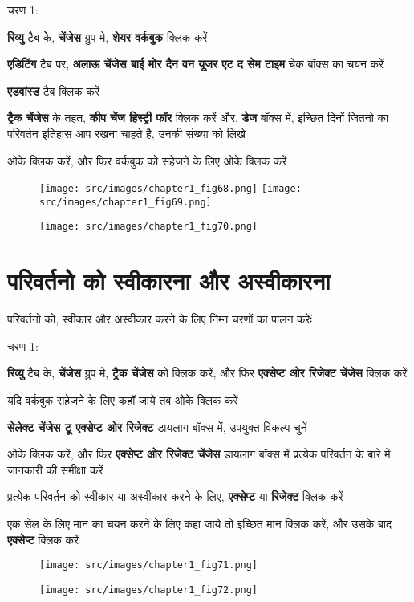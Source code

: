 \begin{descriptionSimple}{चरण 1:}
\item[चरण 1] \textbf{रिव्यु} टैब केे, \textbf{चेंजेस} ग्रुप मे, \textbf{शेयर वर्कबुक} क्लिक करें
\item[चरण 2] \textbf{एडिटिंग} टैब पर, \textbf{अलाऊ चेंजेस बाई मोर दैन वन यूजर एट द सेम टाइम} चेक बॉक्स का चयन करें
\item[चरण 3] \textbf{एडवांस्ड} टैब क्लिक करें
\item[चरण 4] \textbf{ट्रैक चेंजेस} के तहत, \textbf{कीप चेंज हिस्ट्री फॉर} क्लिक करें और, \textbf{डेज} बॉक्स में, इच्छित दिनों जितनो का परिवर्तन इतिहास आप रखना चाहते है, उनकी संख्या को लिखे
\item[चरण 5] ओके क्लिक करें, और फिर वर्कबुक को सहेजने के लिए ओके क्लिक करें
\end{descriptionSimple}
\begin{figure}[H]
\centering
\texttt{[image: src/images/chapter1\_fig68.png]}\qquad
\texttt{[image: src/images/chapter1\_fig69.png]}
\end{figure}
\begin{figure}[H]
\centering
\texttt{[image: src/images/chapter1\_fig70.png]}
\end{figure}				
					
\section{परिवर्तनो को स्वीकारना और अस्वीकारना}\label{id-1.42}

परिवर्तनो को, स्वीकार और अस्वीकार करने के लिए निम्न चरणों का पालन करेःं

\begin{descriptionSimple}{चरण 1:}
\item[चरण 1] \textbf{रिव्यु} टैब के, \textbf{चेंजेस} ग्रुप मे, \textbf{ट्रैक चेंजेस} को क्लिक करें, और फिर \textbf{एक्सेप्ट ओर रिजेक्ट चेंजेस} क्लिक करें
\item[चरण 2] यदि वर्कबुक सहेजने के लिए कहॉ जाये तब ओके क्लिक करें
\item[चरण 3] \textbf{सेलेक्ट चेंजेस टू एक्सेप्ट ओर रिजेक्ट} डायलाग बॉक्स में, उपयुक्त विकल्प चुनें
\item[चरण 4] ओके क्लिक करें, और फिर \textbf{एक्सेप्ट ओर रिजेक्ट चेंजेस} डायलाग बॉक्स में प्रत्येक परिवर्तन के बारे में जानकारी की समीक्षा करें
\item[चरण 5] प्रत्येक परिवर्तन को स्वीकार या अस्वीकार करने के लिए, \textbf{एक्सेप्ट} या \textbf{रिजेक्ट} क्लिक करें
\item[चरण 6] एक सेल के लिए मान का चयन करने के लिए कहा जाये तो इच्छित मान क्लिक करें, और उसके बाद \textbf{एक्सेप्ट} क्लिक करें
\end{descriptionSimple}
\begin{figure}[H]
\centering
\texttt{[image: src/images/chapter1\_fig71.png]}
\end{figure}
\begin{figure}[H]
\centering
\texttt{[image: src/images/chapter1\_fig72.png]}
\end{figure}								

